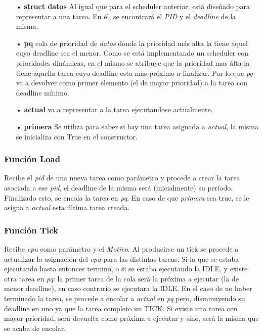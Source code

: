 \documentclass[a4paper]{article}
\begin{document}
	\begin{itemize}
	
	\item[•]\textbf{struct datos} Al igual que para el scheduler anterior, est\'a diseñado para representar a una tarea. En él, se encontrar\'a el \emph{PID} y el \emph{deadline} de la misma.
	\item[•]\textbf{pq} cola de prioridad de \emph{datos} donde la prioridad más alta la tiene aquel cuyo deadline sea el menor. Como se est\'a implementando un scheduler con prioridades dinámicas, en el mismo se atribuye que la prioridad mas álta la tiene aquella tarea cuyo deadline esta mas próximo a finalizar. Por lo que \emph{pq} va a devolver como primer elemento (el de mayor prioridad) a la tarea con deadline m\'inimo.
	\item[•]\textbf{actual} va a representar a la tarea ejecutandose actualmente.
	\item[•]\textbf{primera} Se utiliza para saber si hay una tarea asignada a \emph{actual}, la misma se inicializa con True en el constructor.
	\end{itemize}	

\subsubsection*{Funci\'on Load}

Recibe el \emph{pid} de una nueva tarea como par\'ametro y procede a crear la tarea asociada a ese \emph{pid}, el deadline de la misma ser\'a (inicialmente) su per\'iodo. Finalizado esto, se encola la tarea en \emph{pq}. En caso de que \emph{primera} sea true, se le asigna a \emph{actual} esta última tarea creada.

\subsubsection*{Funci\'on Tick}	

Recibe \emph{cpu} como par\'ametro y el \emph{Motivo}. Al producirse un tick se procede a actualizar la asignación del \emph{cpu} para las distintas tareas.  Si la que se estaba ejecutando hasta entonces terminó, o si se estaba ejecutando la IDLE, y existe otra tarea en \emph{pq}: la primer tarea de la cola será la próxima a ejecutar (la de menor deadline), en caso contrario se ejecutara la IDLE. En el caso de no haber terminado la tarea, se procede a encolar a \emph{actual} en \emph{pq} pero, disminuyendo su deadline en uno ya que la tarea completo un TICK. Si existe una tarea con mayor prioridad, ser\'a devuelta como próxima a ejecutar y sino, ser\'a la misma que se acaba de encolar.  
\end{document}
